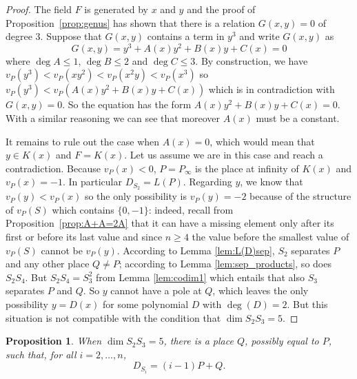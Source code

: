 \documentclass{article}
\theoremstyle{plain}
\newtheorem{prop}[thm]{Proposition}
\theoremstyle{definition}
\theoremstyle{remark}
\renewcommand{\geq}{\geqslant}
\renewcommand{\leq}{\leqslant}
\begin{document}
\begin{proof}
  The field $F$ is generated by $x$ and $y$ and the proof of
  Proposition~\ref{prop:genus} has shown that there is a relation $G(x,y) = 0$
  of degree $3$. Suppose that $G(x,y)$ contains a term in $y^3$ and write $G(x,y)$ as
  \begin{equation*}
  G(x, y) = y^3 + A(x)y^2 + B(x)y + C(x) = 0
  \end{equation*}
 where $\deg A \leq 1$, $\deg B \leq 2$ and $\deg C \leq 3$. 
By construction, we have $v_P(y^3)<v_P(xy^2)<v_P(x^2y)<v_P(x^3)$ so
$v_P(y^3)<v_P(A(x)y^2+B(x)y+C(x))$ which is in contradiction with
$G(x,y)=0$. So the equation has the form $A(x)y^2 + B(x)y + C(x) =
0$. With a similar reasoning we can see that moreover $A(x)$
must be a constant.

It remains to rule out the case when $A(x)=0$,
which would mean that $y\in K(x)$ and  $F=K(x)$. Let us assume we are
in this case and reach a contradiction. Because $v_P(x)<0$,
$P=P_\infty$ is the place at infinity of $K(x)$ and $v_P(x)=-1$. In
particular $D_{S_2}=L(P)$. Regarding $y$, we know that $v_P(y)<v_P(x)$
so the only possibility is $v_P(y)=-2$ because of the structure of
$v_P(S)$ which contains $\{0,-1\}$: indeed, recall from Proposition~\ref{prop:A+A=2A} that it  can have a
missing element only after its first or before its last value and
since $n\geq 4$ the value before the smallest value of $v_P(S)$ cannot be 
$v_P(y)$. According to
Lemma \ref{lem:L(D)sep}, $S_2$ separates $P$ and any other place
$Q\neq P$; according
to Lemma \ref{lem:sep_products}, so does $S_2S_4$. But $S_2S_4=S_3^2$ from Lemma
\ref{lem:codim1} which entails that also $S_3$ separates $P$ and $Q$. So $y$
cannot have a pole at $Q$, which leaves the only possibility
$y=D(x)$ {for some polynomial $D$ with} $\deg(D)=2$. But this situation  is not compatible with the
condition that $\dim S_2S_3=5$.
\end{proof}

\begin{prop}
  When $\dim S_2S_3=5$, there is a place $Q$, possibly equal to $P$,
  such that, for all $i=2,\ldots,n$, 
$$D_{S_i}=(i-1)P+Q.$$
\end{prop}
\end{document}
